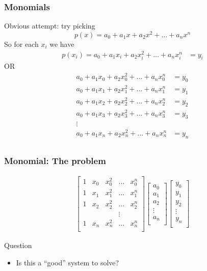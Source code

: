 \documentclass[10pt]{beamer}
\begin{document}
\begin{frame}
\frametitle{Monomials}
  Obvious attempt: try picking
  \begin{equation*}
    p(x) = a_0 + a_1 x + a_2 x^2 +\dots + a_{n} x^{n}
  \end{equation*}
  So for each $x_i$ we have
  \begin{align*}
    p(x_i) = a_0 + a_1 x_i + a_2 x_i^2 +\dots + a_{n} x_i^{n} & = y_i
  \end{align*}
  OR
  \begin{align*}
    a_0 + a_1 x_0 + a_2 x_0^2 +\dots + a_{n} x_0^{n} & = y_0\\
    a_0 + a_1 x_1 + a_2 x_1^2 +\dots + a_{n} x_1^{n} & = y_1\\
    a_0 + a_1 x_2 + a_2 x_2^2 +\dots + a_{n} x_2^{n} & = y_2\\
    a_0 + a_1 x_3 + a_2 x_3^2 +\dots + a_{n} x_3^{n} & = y_3\\
    \vdots &\\
    a_0 + a_1 x_n + a_2 x_n^2 +\dots + a_{n} x_n^{n} & = y_n\\
  \end{align*}
\end{frame}
\begin{frame}
\frametitle{Monomial: The problem}
  \begin{align*}
    \begin{bmatrix}
      1 & x_0 & x_0^2 & \dots & x_0^{n}\\
      1 & x_1 & x_1^2 & \dots & x_1^{n}\\
      1 & x_2 & x_2^2 & \dots & x_2^{n}\\
        &     &       & \vdots&      \\
      1 & x_n & x_n^2 & \dots & x_n^{n}\\
    \end{bmatrix}
    \begin{bmatrix}
      a_0\\
      a_1\\
      a_2\\
      \vdots\\
      a_n\\
    \end{bmatrix}
    \begin{bmatrix}
      y_0\\
      y_1\\
      y_2\\
      \vdots\\
      y_n\\
    \end{bmatrix}
  \end{align*}
  \begin{block}{Question}
    \begin{itemize}
      \item Is this a ``good'' system to solve? 
    \end{itemize}
  \end{block}
\end{frame}
\end{document}
